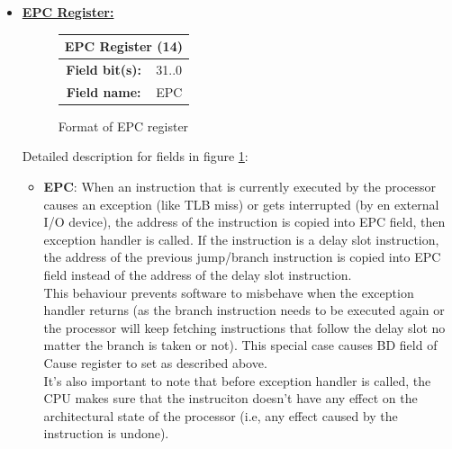 \documentclass[oneside]{book}
\begin{document}
\begin{itemize}
\begin{itemize}
\end{itemize}

\item \textbf{\underline{EPC Register:}}\\

\begin{figure}[H]
\begin{center}
\begin{tabular}{|c|c|}

\hline \multicolumn{2}{|c|}{EPC Register (14)} \\

\hline \textbf{Field bit(s):} & 31..0 \\

\hline \textbf{Field name:}   & EPC   \\

\hline

\end{tabular}

\end{center}
\caption{Format of EPC register}
\label{epc_reg}
\end{figure}

Detailed description for fields in figure \ref{epc_reg}:

\begin{itemize}

\item \textbf{EPC}: When an instruction that is currently
      executed by the processor causes an exception (like
      TLB miss) or gets interrupted (by en external I/O device),
      the address of the instruction is copied into EPC field,
      then exception handler is called.
      If the instruction is a delay slot instruction, the address
      of the previous jump/branch instruction is copied into
      EPC field instead of the address of the delay slot instruction.\\

      This behaviour prevents software to misbehave when the exception
      handler returns (as the branch instruction needs to be executed
      again or the processor will keep fetching instructions that follow
      the delay slot no matter the branch is taken or not). This
      special case causes BD field of Cause register to set as
      described above.\\

      It's also important to note
      that before exception handler is called, the CPU makes
      sure that the instruciton doesn't have any effect on
      the architectural state of the processor (i.e, any
      effect caused by the instruction is undone).

\end{itemize}

\end{itemize}
\end{document}

